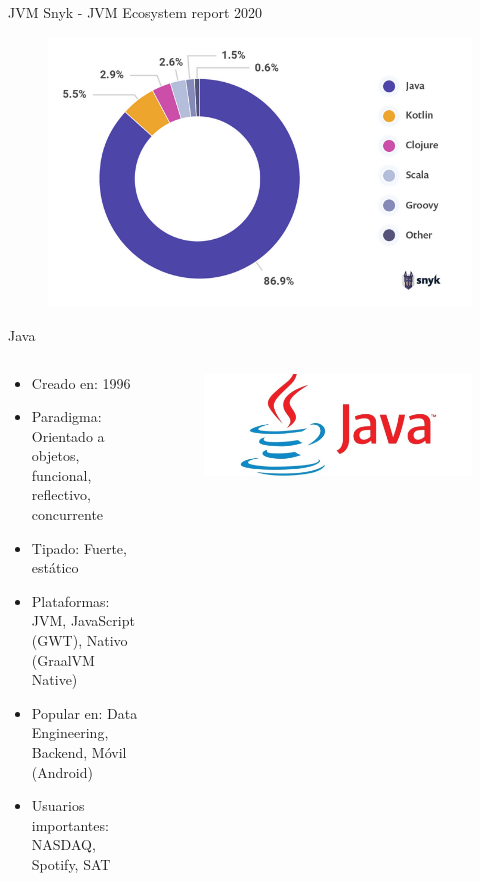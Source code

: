 \documentclass[aspectratio=169]{beamer}
\begin{document}
\begin{frame}{JVM}
	Snyk - JVM Ecosystem report 2020
	
	\begin{figure}
		\centering
		\includegraphics[width=0.7\linewidth]{Images/jvmlangs}
	\end{figure}
	
\end{frame}

\begin{frame}{Java}
	\begin{columns}[T] %
		\begin{column}[T]{0.5\textwidth} %
			\begin{itemize}
				\item Creado en: 1996
				\item Paradigma: Orientado a objetos, funcional, reflectivo, concurrente
				\item Tipado: Fuerte, estático
				\item Plataformas: JVM, JavaScript (GWT), Nativo (GraalVM Native)
                \item Popular en: Data Engineering, Backend, Móvil (Android)
				\item Usuarios importantes: NASDAQ, Spotify, SAT
			\end{itemize}
		\end{column}
		\begin{column}[T]{7cm} %
			\begin{figure}
				\centering
				\includegraphics[width=\linewidth]{Images/java}
			\end{figure}
			
		\end{column}
	\end{columns}
\end{frame}
\end{document}
